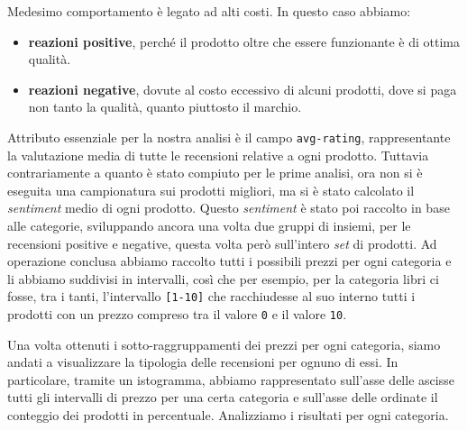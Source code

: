 			Medesimo comportamento è legato ad alti costi. In questo caso abbiamo:
			
			\begin{itemize}
				\item \textbf{reazioni positive}, perché il prodotto oltre che essere funzionante è di ottima qualità.
				\item \textbf{reazioni negative}, dovute al costo eccessivo di alcuni prodotti, dove si paga non tanto la qualità, quanto piuttosto il marchio.
			\end{itemize}
		
			Attributo essenziale per la nostra analisi è il campo \verb|avg-rating|, rappresentante la valutazione media di tutte le recensioni relative a ogni prodotto. Tuttavia
			contrariamente a quanto è stato compiuto per le prime analisi, ora non si è eseguita una campionatura sui prodotti migliori, ma si è stato calcolato il \textit{sentiment} medio di ogni prodotto. Questo \textit{sentiment} è stato poi raccolto in base alle categorie, sviluppando ancora una volta due gruppi di insiemi, per le recensioni positive e negative, questa volta però sull'intero \textit{set} di prodotti. Ad operazione conclusa abbiamo raccolto tutti i possibili prezzi per ogni categoria e li abbiamo suddivisi in intervalli, così che per esempio, per la categoria libri ci fosse, tra i tanti, l'intervallo \verb|[1-10]| che racchiudesse al suo interno tutti i prodotti con un prezzo compreso tra il valore \verb|0| e il valore \verb|10|. 
	
			Una volta ottenuti i sotto-raggruppamenti dei prezzi per ogni categoria, siamo andati a visualizzare la tipologia delle recensioni per ognuno di essi. In particolare, tramite un istogramma, abbiamo rappresentato sull'asse delle ascisse tutti gli intervalli di prezzo per una certa categoria e sull'asse delle ordinate il conteggio dei prodotti in percentuale. Analizziamo i risultati per ogni categoria.
			

